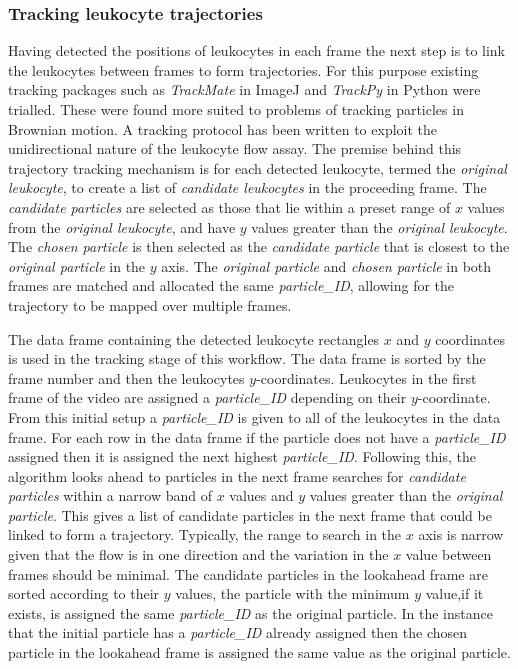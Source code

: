 \subsubsection{Tracking leukocyte trajectories}
Having detected the positions of leukocytes in each frame the next step is to link the leukocytes between frames to form trajectories. For this purpose existing tracking packages such as \emph{TrackMate} in ImageJ and \emph{TrackPy} in Python were trialled. These were found more suited to problems of tracking particles in Brownian motion. A tracking protocol has been written to exploit the unidirectional nature of the leukocyte flow assay. The premise behind this trajectory tracking mechanism is for each detected leukocyte, termed the \emph{original leukocyte}, to create a list of \emph{candidate leukocytes} in the proceeding frame. The \emph{candidate particles} are selected as those that lie within a preset range of $x$ values from the \emph{original leukocyte}, and have $y$ values greater than the \emph{original leukocyte}. The \emph{chosen particle} is then selected as the \emph{candidate particle} that is closest to the \emph{original particle} in the $y$ axis. The \emph{original particle} and \emph{chosen particle} in both frames are matched and allocated the same \emph{particle\_ID}, allowing for the trajectory to be mapped over multiple frames.

The data frame containing the detected leukocyte rectangles $x$ and $y$ coordinates is used in the tracking stage of this workflow. The data frame is sorted by the frame number and then the leukocytes $y$-coordinates. Leukocytes in the first frame of the video are assigned a \emph{particle\_ID} depending on their $y$-coordinate. From this initial setup a \emph{particle\_ID} is given to all of the leukocytes in the data frame. For each row in the data frame if the particle does not have a \emph{particle\_ID} assigned then it is assigned the next highest \emph{particle\_ID}. Following this, the algorithm looks ahead to particles in the next frame searches for \emph{candidate particles} within a narrow band of $x$ values and $y$ values greater than the \emph{original particle}. This gives a list of candidate particles in the next frame that could be linked to form a trajectory. Typically, the range to search in the $x$ axis is narrow given that the flow is in one direction and the variation in the $x$ value between frames should be minimal. The candidate particles in the lookahead frame are sorted according to their $y$ values, the particle with the minimum $y$ value,if it exists, is assigned the same \emph{particle\_ID} as the original particle. In the instance that the initial particle has a \emph{particle\_ID} already assigned then the chosen particle in the lookahead frame is assigned the same value as the original particle. 

